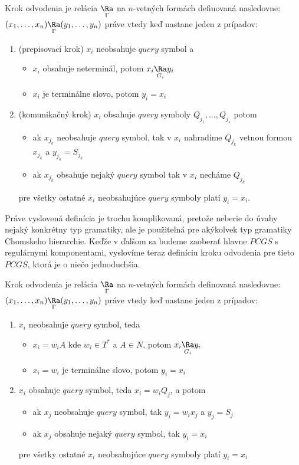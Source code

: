 \begin{definicia}
Krok odvodenia je relácia $\underset{\Gamma}\Ra$ na $n$-vetných
formách definovaná nasledovne: $(x_1,\dots
,x_n)\underset{\Gamma}\Ra (y_1,\dots ,y_n)$ práve vtedy keď
nastane jeden z prípadov:
\begin{enumerate}
  \item (prepisovací krok) $x_i$ neobsahuje $query$ symbol a
  \begin{itemize}
    \item $x_i$ obsahuje neterminál, potom $x_i\underset{G_i}\Ra y_i$
    \item $x_i$ je terminálne slovo, potom $y_i=x_i$
  \end{itemize}
  \item (komunikačný krok) $x_i$ obsahuje $query$ symboly $Q_{j_1},\dots ,Q_{j_s}$ potom
  \begin{itemize}
    \item ak $x_{j_k}$ neobsahuje $query$ symbol, tak v $x_i$ nahradíme
    $Q_{j_k}$ vetnou formou $x_{j_k}$ a \mbox{$y_{j_k}=S_{j_k}$}
    \item ak $x_{j_k}$ obsahuje nejaký $query$ symbol tak v $x_i$ necháme $Q_{j_k}$
  \end{itemize}
  pre všetky ostatné $x_i$ neobsahujúce $query$ symboly platí
  $y_i=x_i$.
\end{enumerate}
\end{definicia}

Práve vyslovená definícia je trochu komplikovaná, pretože neberie
do úvahy nejaký konkrétny typ gramatiky, ale je použiteľná pre
akýkoľvek typ gramatiky Chomskeho hierarchie. Keďže v ďalšom sa
budeme zaoberať hlavne $PCGS$ s regulárnymi komponentami,
vyslovíme teraz definíciu kroku odvodenia pre tieto $PCGS$, ktorá
je o niečo jednoduchšia.

\begin{definicia}
Krok odvodenia je relácia $\underset{\Gamma}\Ra$ na $n$-vetných
formách definovaná nasledovne: $(x_1,\dots
,x_n)\underset{\Gamma}\Ra (y_1,\dots ,y_n)$ práve vtedy keď
nastane jeden z prípadov:
\begin{enumerate}
  \item $x_i$ neobsahuje $query$ symbol, teda
  \begin{itemize}
    \item $x_i=w_iA$ kde $w_i\in T^*$ a $A\in N$, potom $x_i\underset{G_i}\Ra y_i$
    \item $x_i=w_i$ je terminálne slovo, potom $y_i=x_i$
  \end{itemize}
  \item $x_i$ obsahuje $query$ symbol, teda $x_i=w_iQ_j$, a potom
  \begin{itemize}
    \item ak $x_j$ neobsahuje $query$ symbol, tak $y_i=w_ix_j$ a $y_j=S_j$
    \item ak $x_j$ obsahuje nejaký $query$ symbol, tak $y_i=x_i$
  \end{itemize}
  pre všetky ostatné $x_i$ neobsahujúce $query$ symboly platí
  $y_i=x_i$
\end{enumerate}
\end{definicia}

